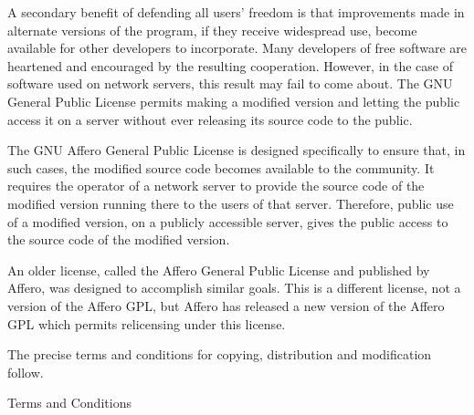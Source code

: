 \documentclass{article}%
\begin{document}
A secondary benefit of defending all users' freedom is that
improvements made in alternate versions of the program, if they
receive widespread use, become available for other developers to
incorporate.    Many developers of free software are heartened and
encouraged by the resulting cooperation.        However, in the case of
software used on network servers, this result may fail to come about.
The GNU General Public License permits making a modified version and
letting the public access it on a server without ever releasing its
source code to the public.

The GNU Affero General Public License is designed specifically to
ensure that, in such cases, the modified source code becomes available
to the community.        It requires the operator of a network server to
provide the source code of the modified version running there to the
users of that server.    Therefore, public use of a modified version, on
a publicly accessible server, gives the public access to the source
code of the modified version.

An older license, called the Affero General Public License and
published by Affero, was designed to accomplish similar goals.  This is
a different license, not a version of the Affero GPL, but Affero has
released a new version of the Affero GPL which permits relicensing under
this license.

The precise terms and conditions for copying, distribution and
modification follow.

\begin{center}
{\Large \sc Terms and Conditions}
\end{center}
\end{document}
